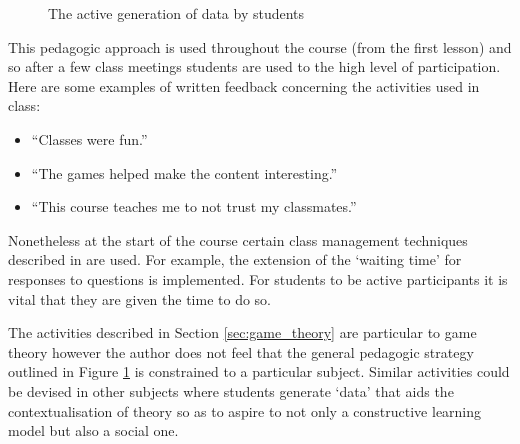 \documentclass[12pt, a4paper]{article}
\begin{document}
\begin{figure}[!hbtp]
    \centering
    \caption{The active generation of data by students}
    \label{fig:use_of_data}
\end{figure}

This pedagogic approach is used throughout the course (from the first lesson)
and so after a few class meetings students are used to the high level of
participation. Here are some examples of written feedback concerning the
activities used in class:

\begin{itemize}
    \item ``Classes were fun.''
    \item ``The games helped make the content interesting.''
    \item ``This course teaches me to not trust my classmates.''
\end{itemize}

Nonetheless at the start of the course certain class management techniques
described in \cite{Rocca2010} are used. For example, the extension of the
`waiting time' for responses to questions is implemented. For students to be
active participants it is vital that they are given the time to do so.


The activities described in Section \ref{sec:game_theory} are particular to game
theory however the author does not feel that the general pedagogic strategy
outlined in Figure \ref{fig:use_of_data} is constrained to a particular subject.
Similar activities could be devised in other subjects where students generate
`data' that aids the contextualisation of theory so as to aspire to not only a
constructive learning model but also a social one.

\printbibliography
\end{document}
